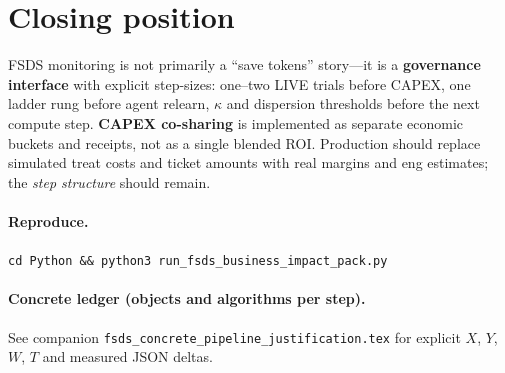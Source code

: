 \documentclass[11pt]{article}
\begin{document}
\section{Closing position}
FSDS monitoring is not primarily a ``save tokens'' story---it is a \textbf{governance interface} with explicit step-sizes: one--two LIVE trials before CAPEX, one ladder rung before agent relearn, $\kappa$ and dispersion thresholds before the next compute step.
\textbf{CAPEX co-sharing} is implemented as separate economic buckets and receipts, not as a single blended ROI.
Production should replace simulated treat costs and ticket amounts with real margins and eng estimates; the \emph{step structure} should remain.

\paragraph{Reproduce.}
\texttt{cd Python \&\& python3 run\_fsds\_business\_impact\_pack.py}

\paragraph{Concrete ledger (objects and algorithms per step).}
See companion \texttt{fsds\_concrete\_pipeline\_justification.tex} for explicit $X$, $Y$, $W$, $T$ and measured JSON deltas.
\end{document}
